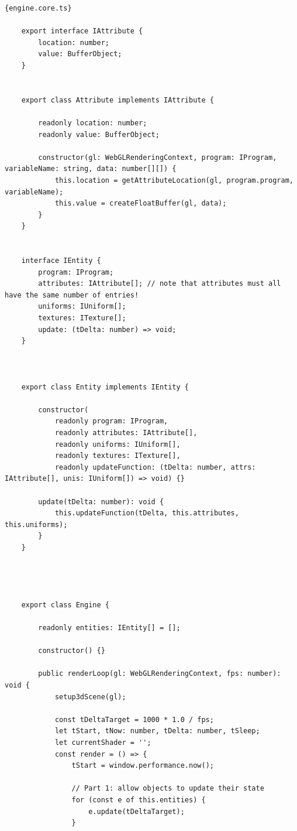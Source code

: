 \begin{lstlisting}{engine.core.ts}
    
    export interface IAttribute {
        location: number;
        value: BufferObject;
    }
    
    
    export class Attribute implements IAttribute {
    
        readonly location: number;
        readonly value: BufferObject;
    
        constructor(gl: WebGLRenderingContext, program: IProgram, variableName: string, data: number[][]) {
            this.location = getAttributeLocation(gl, program.program, variableName);
            this.value = createFloatBuffer(gl, data);
        }
    }
    
    
    interface IEntity {
        program: IProgram;
        attributes: IAttribute[]; // note that attributes must all have the same number of entries!
        uniforms: IUniform[];
        textures: ITexture[];
        update: (tDelta: number) => void;
    }
    
    
    
    export class Entity implements IEntity {
    
        constructor(
            readonly program: IProgram,
            readonly attributes: IAttribute[],
            readonly uniforms: IUniform[],
            readonly textures: ITexture[],
            readonly updateFunction: (tDelta: number, attrs: IAttribute[], unis: IUniform[]) => void) {}
    
        update(tDelta: number): void {
            this.updateFunction(tDelta, this.attributes, this.uniforms);
        }
    }
    
    
    
    
    export class Engine {
    
        readonly entities: IEntity[] = [];
    
        constructor() {}
    
        public renderLoop(gl: WebGLRenderingContext, fps: number): void {
            setup3dScene(gl);
    
            const tDeltaTarget = 1000 * 1.0 / fps;
            let tStart, tNow: number, tDelta: number, tSleep;
            let currentShader = '';
            const render = () => {
                tStart = window.performance.now();
    
                // Part 1: allow objects to update their state
                for (const e of this.entities) {
                    e.update(tDeltaTarget);
                }
    

\end{lstlisting}
